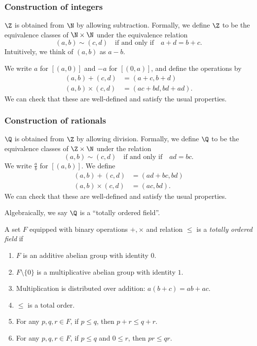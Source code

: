 \documentclass[a4paper]{article}
\begin{document}
\subsubsection*{Construction of integers}
\begin{defi}[Integers]
  $\Z$ is obtained from $\N$ by allowing subtraction. Formally, we define $\Z$ to be the equivalence classes of $\N\times \N$ under the equivalence relation
  \[
    (a, b) \sim (c, d) \quad\text{if and only if}\quad a + d = b + c.
  \]
  Intuitively, we think of $(a, b)$ as $a - b$.

  We write $a$ for $[(a, 0)]$ and $-a$ for $[(0, a)]$, and define the operations by
  \begin{align*}
    (a, b) + (c, d) &= (a + c, b + d)\\
    (a, b)\times (c, d) &= (ac + bd, bd + ad).
  \end{align*}
  We can check that these are well-defined and satisfy the usual properties.
\end{defi}

\subsubsection*{Construction of rationals}
\begin{defi}[Rationals]
  $\Q$ is obtained from $\Z$ by allowing division. Formally, we define $\Q$ to be the equivalence classes of $\Z \times \N$ under the relation
  \[
    (a, b) \sim (c, d)\quad\text{if and only if}\quad ad = bc.
  \]
  We write $\frac{a}{b}$ for $[(a, b)]$. We define
  \begin{align*}
   (a, b) + (c, d) &= (ad + bc, bd)\\
   (a, b)\times (c, d) &= (ac, bd).
  \end{align*}
  We can check that these are well-defined and satisfy the usual properties.
\end{defi}

Algebraically, we say $\Q$ is a ``totally ordered field''.
\begin{defi}
  A set $F$ equipped with binary operations $+, \times$ and relation $\leq$ is a \emph{totally ordered field} if
  \begin{enumerate}
    \item $F$ is an additive abelian group with identity $0$.
    \item $F\setminus \{0\}$ is a multiplicative abelian group with identity $1$.
    \item Multiplication is distributed over addition: $a(b + c) = ab + ac$.
    \item $\leq$ is a total order.
    \item For any $p, q, r \in F$, if $p \leq q$, then $p + r \leq q+ r$.
    \item For any $p, q, r \in F$, if $p \leq q$ and $0 \leq r$, then $p r \leq qr$.
  \end{enumerate}
\end{defi}
\end{document}
